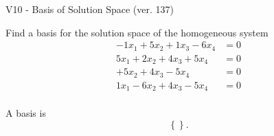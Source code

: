 \begin{exercise}
  \begin{exerciseTitle}V10 - Basis of Solution Space (ver. 137)\end{exerciseTitle}
  \begin{exerciseStatement}
    Find a basis for the solution space of the homogeneous system 
\begin{align*}
 -1 x_ 1 + 5 x_ 2 + 1 x_ 3 -6 x_ 4 &= 0  \\ 
  5 x_ 1 + 2 x_ 2 + 4 x_ 3 + 5 x_ 4 &= 0  \\ 
  + 5 x_ 2 + 4 x_ 3 -5 x_ 4 &= 0  \\ 
  1 x_ 1 -6 x_ 2 + 4 x_ 3 -5 x_ 4 &= 0  \\ 
 \end{align*}


 
  \end{exerciseStatement}

  \begin{exerciseAnswer}
   A basis is   
\[\left\{\right\}.\]

  


  \end{exerciseAnswer}
\end{exercise}